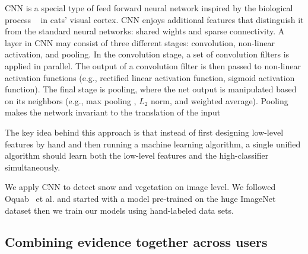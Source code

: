 CNN is a special type of feed forward neural network inspired by the biological process ~\cite{krizhevsky2012imagenet} in cats' visual cortex. 
CNN enjoys additional features that distinguish it from the standard neural networks: shared wights and sparse connectivity.
A layer in CNN may consist of three different stages: convolution, non-linear activation, and pooling.
In the convolution stage, a set of convolution filters is applied in parallel. 
The output of a convolution filter is then passed to non-linear activation functions (e.g., rectified linear activation function, sigmoid activation function).
The final stage is pooling, where the net output is manipulated based on its neighbors (e.g., max pooling , $L_2$ norm, and weighted average).
Pooling makes the network invariant to the translation of the input

The key idea behind this approach is that instead of first designing low-level features by
hand and then running a machine learning algorithm, a single unified
algorithm should learn both the low-level features and the
high-classifier simultaneously. 

We apply CNN to detect snow and vegetation on image level. We followed Oquab~\cite{Oquab14} et al. and started with a model pre-trained on the huge ImageNet dataset then we train our models using hand-labeled data sets.
 



\subsection{Combining evidence together across users}

